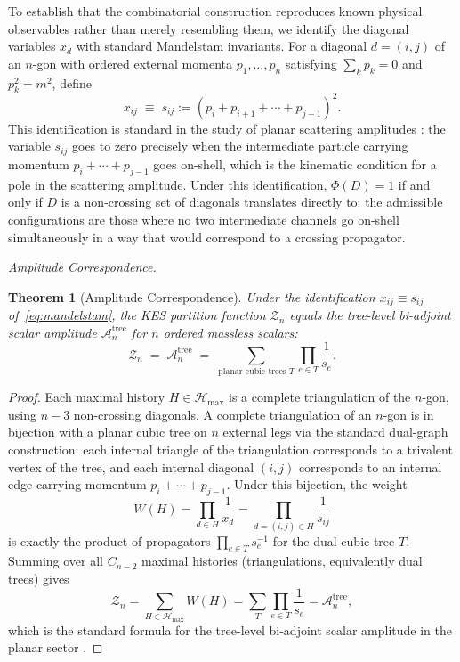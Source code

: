 \documentclass[11pt]{article}
\theoremstyle{plain}
\newtheorem{theorem}{Theorem}[section]
\theoremstyle{definition}
\theoremstyle{remark}
\newcommand{\Phif}{\Phi}
\newcommand{\Hmax}{\mathcal{H}_{\max}}
\begin{document}
To establish that the combinatorial construction reproduces known physical
observables rather than merely resembling them, we identify the diagonal
variables $x_d$ with standard Mandelstam invariants. For a diagonal
$d = (i,j)$ of an $n$-gon with ordered external momenta
$p_1, \ldots, p_n$ satisfying $\sum_k p_k = 0$ and $p_k^2 = m^2$,
define
\begin{equation}
\label{eq:mandelstam}
  x_{ij} \;\equiv\; s_{ij} := (p_i + p_{i+1} + \cdots + p_{j-1})^2.
\end{equation}
This identification is standard in the study of planar scattering amplitudes
\cite{ABHY2018}: the variable $s_{ij}$ goes to zero precisely when the
intermediate particle carrying momentum $p_i + \cdots + p_{j-1}$ goes
on-shell, which is the kinematic condition for a pole in the scattering
amplitude. Under this identification, $\Phif(D) = 1$ if and only if $D$ is
a non-crossing set of diagonals translates directly to: the admissible
configurations are those where no two intermediate channels go on-shell
simultaneously in a way that would correspond to a crossing propagator.

\medskip\noindent\textit{Amplitude Correspondence.}

\begin{theorem}[Amplitude Correspondence]
\label{thm:amplitude}
Under the identification $x_{ij} \equiv s_{ij}$ of~\eqref{eq:mandelstam},
the KES partition function $\mathcal{Z}_n$ equals the
tree-level bi-adjoint scalar amplitude $\mathcal{A}_n^{\mathrm{tree}}$
for $n$ ordered massless scalars:
\[
  \mathcal{Z}_n \;=\; \mathcal{A}_n^{\mathrm{tree}}
  \;=\; \sum_{\text{planar cubic trees } T}
  \prod_{e \in T} \frac{1}{s_e}.
\]
\end{theorem}

\begin{proof}
Each maximal history $H \in \Hmax$ is a complete triangulation of the
$n$-gon, using $n-3$ non-crossing diagonals. A complete triangulation of
an $n$-gon is in bijection with a planar cubic tree on $n$ external legs
via the standard dual-graph construction: each internal triangle of the
triangulation corresponds to a trivalent vertex of the tree, and each
internal diagonal $(i,j)$ corresponds to an internal edge carrying momentum
$p_i + \cdots + p_{j-1}$.
Under this bijection, the weight
\[
  W(H) = \prod_{d \in H} \frac{1}{x_d} = \prod_{d = (i,j) \in H}
  \frac{1}{s_{ij}}
\]
is exactly the product of propagators $\prod_{e \in T} s_e^{-1}$ for the
dual cubic tree $T$. Summing over all $C_{n-2}$ maximal histories
(triangulations, equivalently dual trees) gives
\[
  \mathcal{Z}_n = \sum_{H \in \Hmax} W(H) = \sum_T \prod_{e \in T}
  \frac{1}{s_e} = \mathcal{A}_n^{\mathrm{tree}},
\]
which is the standard formula for the tree-level bi-adjoint scalar
amplitude in the planar sector \cite{ABHY2018}. \end{proof}
\end{document}
